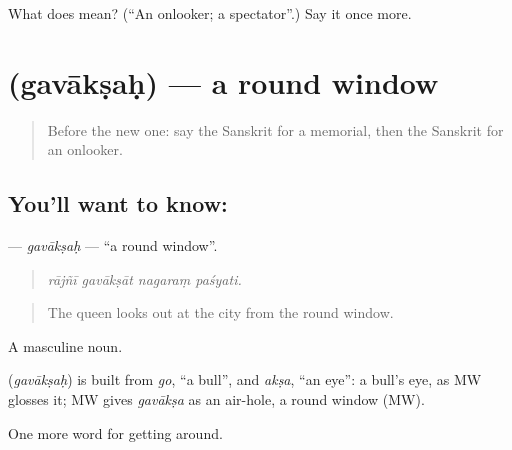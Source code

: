\begin{tcolorbox}[breakable,colback=teal!4,colframe=teal!35!black,title={Before you move on}]
What does  mean? (\textquotedblleft{}An onlooker; a spectator\textquotedblright{}.) Say it once more.
\end{tcolorbox}
\section[\texorpdfstring{\sk{गवाक्षः} (gavākṣaḥ)}{गवाक्षः (gavākṣaḥ)}]{ (gavākṣaḥ) — a round window}

\label{lesson:SA-C425-gavaksah}



\begin{quote}
Before the new one: say the Sanskrit for a memorial, then the Sanskrit for an onlooker.
\end{quote}

\subsection*{You'll want to know: }
\textbf{} — \emph{gavākṣaḥ} — \textquotedblleft{}a round window\textquotedblright{}.

\begin{quote}
   
\end{quote}

\begin{quote}
\emph{rājñī gavākṣāt nagaraṃ paśyati.}
\end{quote}

\begin{quote}
The queen looks out at the city from the round window.
\end{quote}

A masculine noun.

\begin{cousinweb}
\textbf{} (\emph{gavākṣaḥ}) is built from \emph{go}, \textquotedblleft{}a bull\textquotedblright{}, and \emph{akṣa}, \textquotedblleft{}an eye\textquotedblright{}: a bull's eye, as MW glosses it; MW gives \emph{gavākṣa} as an air-hole, a round window (MW).
\end{cousinweb}

\begin{grammarlens}[title={What you've built}]
One more word for getting around.
\end{grammarlens}


